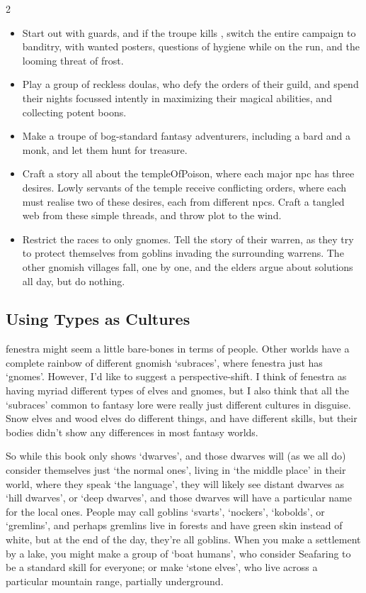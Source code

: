 \begin{multicols}{2}
\begin{itemize}
  \item
  Start out with \glspl{guard}, and if the troupe kills , switch the entire \gls{campaign} to banditry, with wanted posters, questions of hygiene while on the run, and the looming threat of frost.
  \item
  Play a group of reckless \glspl{doula}, who defy the orders of their guild, and spend their nights focussed intently in maximizing their magical abilities, and collecting potent \glspl{boon}.
  \item
  Make a troupe of bog-standard fantasy adventurers, including a bard and a monk, and let them hunt for treasure.
  \item
  Craft a story all about the \gls{templeOfPoison}, where each major \gls{npc} has three desires.
  Lowly servants of the temple receive conflicting orders, where each must realise two of these desires, each from different \glspl{npc}.
  Craft a tangled web from these simple threads, and throw plot to the wind.
  \item
  Restrict the races to only gnomes.
  Tell the story of their warren, as they try to protect themselves from goblins invading the surrounding warrens.
  The other gnomish villages fall, one by one, and the elders argue about solutions all day, but do nothing.
\end{itemize}

\subsection{Using Types as Cultures}

\Gls{fenestra} might seem a little bare-bones in terms of people.
Other worlds have a complete rainbow of different gnomish `subraces', where \gls{fenestra} just has `gnomes'.
However, I'd like to suggest a perspective-shift.
I think of \gls{fenestra} as having myriad different types of elves and gnomes, but I also think that all the `subraces' common to fantasy lore were really just different cultures in disguise.
Snow elves and wood elves do different things, and have different skills, but their bodies didn't show any differences in most fantasy worlds.

So while this book only shows `dwarves', and those dwarves will (as we all do) consider themselves just `the normal ones', living in `the middle place' in their world, where they speak `the language', they will likely see distant dwarves as `hill dwarves', or `deep dwarves', and those dwarves will have a particular name for the local ones.
People may call goblins `svarts', `nockers', `kobolds', or `gremlins', and perhaps gremlins live in forests and have green skin instead of white, but at the end of the day, they're all goblins.
When you make a settlement by a lake, you might make a group of `boat humans', who consider Seafaring to be a standard \gls{skill} for everyone; or make `stone elves', who live across a particular mountain range, partially underground.


\end{multicols}
